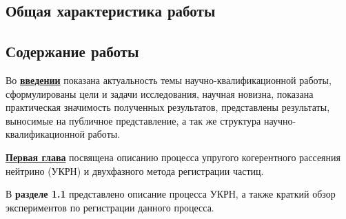 \subsection*{Общая характеристика работы}

\newcommand{\actuality}{\underline{\textbf{Актуальность темы.}}}
\newcommand{\aim}{\underline{\textbf{Целью}}}
\newcommand{\tasks}{\underline{\textbf{задачи}}}
\newcommand{\defpositions}{\underline{\textbf{Основные положения, выносимые на~защиту:}}}
\newcommand{\novelty}{\underline{\textbf{Научная новизна:}}}
\newcommand{\influence}{\underline{\textbf{Практическая значимость}}}
\newcommand{\reliability}{\underline{\textbf{Достоверность}}}
\newcommand{\probation}{\underline{\textbf{Апробация работы.}}}
\newcommand{\contribution}{\underline{\textbf{Личный вклад.}}}
\newcommand{\publications}{\underline{\textbf{Публикации.}}}




\subsection*{Содержание работы}
Во \underline{\textbf{введении}} показана актуальность темы научно-квалификационной
работы, сформулированы цели и задачи исследования, научная новизна,
показана практическая значимость полученных результатов, представлены
результаты, выносимые на публичное представление, а так же структура научно-квалификационной работы.

\underline{\textbf{Первая глава}} посвящена описанию процесса упругого когерентного рассеяния нейтрино (УКРН) и двухфазного метода регистрации частиц. 

В \textbf{разделе 1.1} представлено описание процесса УКРН, а также краткий обзор экспериментов по регистрации данного процесса. 

